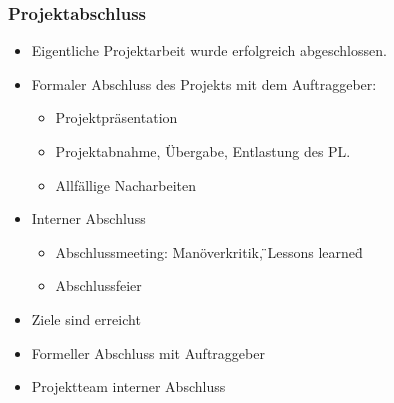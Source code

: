 \subsubsection{Projektabschluss}
\begin{itemize}
	\item Eigentliche Projektarbeit wurde erfolgreich abgeschlossen.
	\item Formaler Abschluss des Projekts mit dem Auftraggeber:
	\begin{itemize}
		\item Projektpräsentation
		\item Projektabnahme, Übergabe, Entlastung des PL.
		\item Allfällige Nacharbeiten
	\end{itemize}
	\item Interner Abschluss
	\begin{itemize}
		\item Abschlussmeeting: Manöverkritik, \"{}Lessons learned\"{}
		\item Abschlussfeier
	\end{itemize}
	\item Ziele sind erreicht
	\item Formeller Abschluss mit Auftraggeber
	\item Projektteam interner Abschluss
\end{itemize}
\clearpage